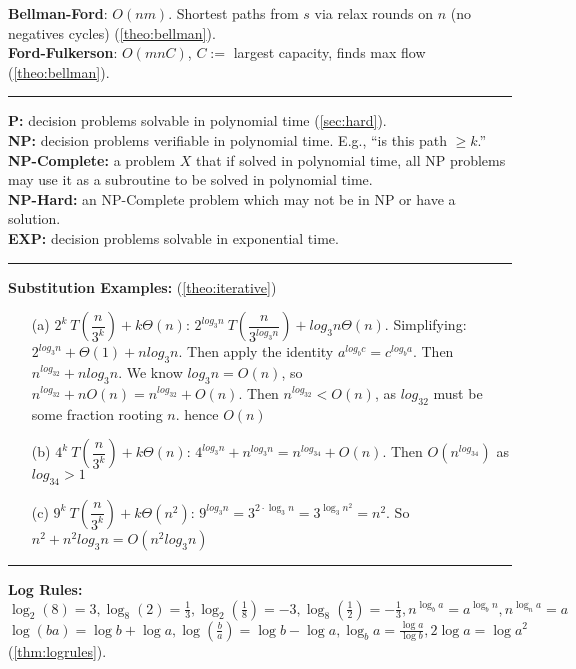 \textbf{Bellman-Ford}: $O(nm)$. Shortest paths from $s$ via relax rounds on $n$ (no negatives cycles) (\ref{theo:bellman}).\\
\textbf{Ford-Fulkerson}: $O(mnC)$, $C:=$ largest capacity, finds max flow (\ref{theo:bellman}).\\
\noindent\rule{\textwidth}{0.4pt}
\textbf{P:} decision problems solvable in polynomial time (\ref{sec:hard}).\\
\textbf{NP:} decision problems verifiable in polynomial time. E.g., ``is this path $\geq k$.''\\
\textbf{NP-Complete:} a problem $X$ that if solved in polynomial time, all NP problems may use it as a subroutine to be solved in polynomial time.\\
\textbf{NP-Hard:} an NP-Complete problem which may not be in NP or have a solution.\\
\textbf{EXP:} decision problems solvable in exponential time.\\
\noindent\rule{\textwidth}{0.4pt}
\textbf{Substitution Examples:} (\ref{theo:iterative})

\vspace{-.5em}
\begin{itemize}
    \item[(a)] $2^{k}\ T \left(\dfrac{n}{3^k} \right)+k \Theta(n)$: $2^{log_3n}\ T \left(\dfrac{n}{3^{log_3n}} \right)+log_3n \Theta(n)$.
    Simplifying: $2^{log_3n}+\Theta(1)+nlog_3n$. Then apply the identity $a^{log_bc}=c^{log_ba}$.
    Then $n^{log_32}+nlog_3n$. We know $log_3n=O(n)$, so $n^{log_32}+nO(n)=n^{log_32}+O(n)$.
    Then $n^{log_32}<O(n)$, as $log_32$ must be some fraction rooting $n$. hence $O(n)$

    \item[(b)] $4^{k}\ T \left(\dfrac{n}{3^k} \right)+k \Theta(n)$: $4^{log_3n}+n^{log_3n}=n^{log_34}+O(n)$. Then $O(n^{log_34})$ as $log_34>1$
    \item[(c)]  $9^{k}\ T \left(\dfrac{n}{3^k} \right)+k \Theta(n^2)$: $9^{log_3n}=3^{2\cdot\log_3n}=3^{\log_3n^2}=n^2$.
    So $n^2+n^2log_3n = O(n^2log_3n) $
\end{itemize}
\noindent\rule{\textwidth}{0.4pt}
\textbf{Log Rules:} $\log_2(8)=3,\log_8(2)=\frac{1}{3},\log_2(\frac{1}{8})=-3, \log_8(\frac{1}{2})=-\frac{1}{3},n^{\log_ba}=a^{\log_bn},n^{\log_na}=a$\\

\vspace{-1em}
\noindent
$\log(ba)=\log b+\log a,\log(\frac{b}{a})=\log b-\log a,\log_ba=\frac{\log a}{\log b},2\log a= \log a^2$ (\ref{thm:logrules}).

